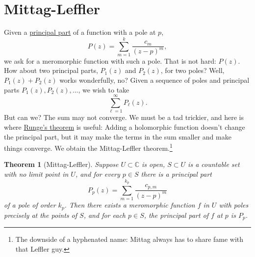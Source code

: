 \documentclass[12pt,openany]{book}
\newcommand{\C}{{\mathbb{C}}}
\theoremstyle{plain}
\newtheorem{thm}{Theorem}[section]
\theoremstyle{remark}
\theoremstyle{definition}
\theoremstyle{exercise}
\theoremstyle{example}
\begin{document}
\section{Mittag-Leffler}
\label{sec:mittagleffler}

Given a \hyperref[defn:principalpart]{principal part} of a function with a pole at $p$,
\begin{equation*}
P(z) = \sum_{m=1}^{k} \frac{c_m}{{(z-p)}^m} ,
\end{equation*}
we ask for a meromorphic function with such a pole.  That
is not hard: $P(z)$.  How about two principal parts, $P_1(z)$ and $P_2(z)$,
for two poles?  Well, $P_1(z)+P_2(z)$ works wonderfully, no?
Given a sequence of poles and principal parts
$P_1(z),P_2(z),\ldots$, we wish to take
\begin{equation*}
\sum_{\ell=1}^\infty P_\ell(z) .
\end{equation*}
But can we?  The sum may not converge.  We must be a tad
trickier, and here is where \hyperref[thm:rungecpt]{Runge's theorem} is useful:  Adding
a holomorphic function doesn't change the principal part, but it may make
the terms in the sum smaller and make things converge.
We obtain the
Mittag-Leffler theorem.\footnote{The downside of a hyphenated name:
Mittag always has to share fame with that Leffler guy.}

\begin{thm}[Mittag-Leffler]
Suppose $U \subset \C$ is open, $S \subset U$ is a countable set with no
limit point in $U$, and for every $p \in S$ there is a principal part
\begin{equation*}
P_p(z) = \sum_{m=1}^{k_p} \frac{c_{p,m}}{{(z-p)}^m}
\end{equation*}
of a pole of order $k_p$.  Then there exists a meromorphic function $f$ in $U$
with poles precisely at the points of $S$, and for each $p \in S$,
the principal part of $f$ at $p$ is $P_p$.
\end{thm}
\end{document}
